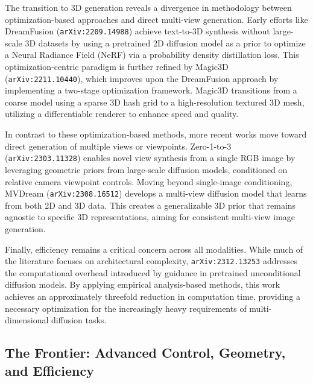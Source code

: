 \documentclass[11pt]{article}
\begin{document}
The transition to 3D generation reveals a divergence in methodology between optimization-based approaches and direct multi-view generation. Early efforts like DreamFusion (\texttt{arXiv:2209.14988}) achieve text-to-3D synthesis without large-scale 3D datasets by using a pretrained 2D diffusion model as a prior to optimize a Neural Radiance Field (NeRF) via a probability density distillation loss. This optimization-centric paradigm is further refined by Magic3D (\texttt{arXiv:2211.10440}), which improves upon the DreamFusion approach by implementing a two-stage optimization framework. Magic3D transitions from a coarse model using a sparse 3D hash grid to a high-resolution textured 3D mesh, utilizing a differentiable renderer to enhance speed and quality.

In contrast to these optimization-based methods, more recent works move toward direct generation of multiple views or viewpoints. Zero-1-to-3 (\texttt{arXiv:2303.11328}) enables novel view synthesis from a single RGB image by leveraging geometric priors from large-scale diffusion models, conditioned on relative camera viewpoint controls. Moving beyond single-image conditioning, MVDream (\texttt{arXiv:2308.16512}) develops a multi-view diffusion model that learns from both 2D and 3D data. This creates a generalizable 3D prior that remains agnostic to specific 3D representations, aiming for consistent multi-view image generation.

Finally, efficiency remains a critical concern across all modalities. While much of the literature focuses on architectural complexity, \texttt{arXiv:2312.13253} addresses the computational overhead introduced by guidance in pretrained unconditional diffusion models. By applying empirical analysis-based methods, this work achieves an approximately threefold reduction in computation time, providing a necessary optimization for the increasingly heavy requirements of multi-dimensional diffusion tasks.

\subsection{The Frontier: Advanced Control, Geometry, and Efficiency}
\end{document}

